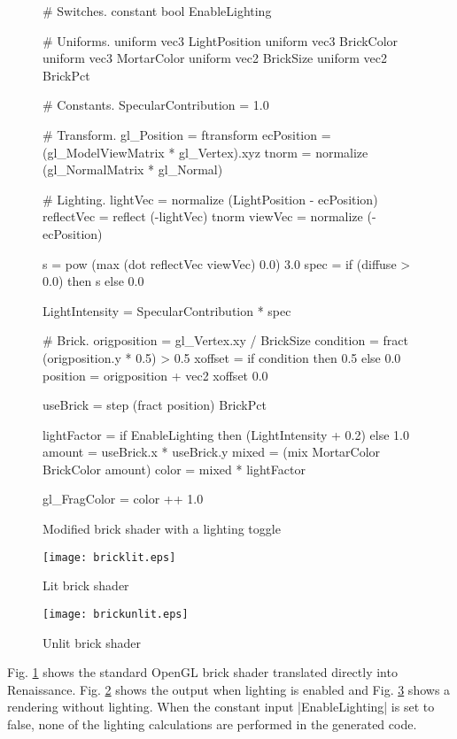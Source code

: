 \documentclass[review]{acmsiggraph}      %
\begin{document}
\begin{figure}[htb]
\begin{MyVerb}
# Switches.
constant bool EnableLighting

# Uniforms.
uniform vec3 LightPosition
uniform vec3 BrickColor
uniform vec3 MortarColor
uniform vec2 BrickSize
uniform vec2 BrickPct

# Constants.
SpecularContribution = 1.0

# Transform.
gl_Position = ftransform
ecPosition = (gl_ModelViewMatrix * gl_Vertex).xyz
tnorm = normalize (gl_NormalMatrix * gl_Normal)

# Lighting.
lightVec   = normalize (LightPosition - ecPosition)
reflectVec = reflect (-lightVec) tnorm
viewVec    = normalize (-ecPosition)

s = pow (max (dot reflectVec viewVec) 0.0) 3.0
spec = if (diffuse > 0.0) then s else 0.0

LightIntensity = SpecularContribution * spec

# Brick.
origposition = gl_Vertex.xy / BrickSize
condition = fract (origposition.y * 0.5) > 0.5
xoffset = if condition then 0.5 else 0.0
position = origposition + vec2 xoffset 0.0

useBrick = step (fract position) BrickPct

lightFactor = if EnableLighting then
              (LightIntensity + 0.2) else 1.0
amount = useBrick.x * useBrick.y
mixed = (mix MortarColor BrickColor amount)
color = mixed * lightFactor

gl_FragColor = color ++ 1.0
\end{MyVerb}
\caption{Modified brick shader with a lighting toggle 
}
\label{BrickShader}
\end{figure}

\begin{figure}
\begin{center}
\texttt{[image: bricklit.eps]}
\caption{Lit brick shader}
\end{center}
\label{BrickLit}
\end{figure}

\begin{figure}
\begin{center}
\texttt{[image: brickunlit.eps]}
\caption{Unlit brick shader}
\end{center}
\label{BrickUnlit}
\end{figure}

Fig. \ref{BrickShader} shows the standard OpenGL brick shader
translated directly into Renaissance.  Fig. \ref{BrickLit} shows the
output when lighting is enabled and Fig. \ref{BrickUnlit} shows a
rendering without lighting.  When the constant input |EnableLighting|
is set to false, none of the lighting calculations are performed in
the generated code.
\end{document}
